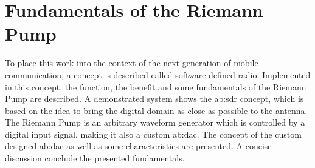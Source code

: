 \chapter{Fundamentals of the Riemann Pump}
\label{ch:fundamentals}
To place this work into the context of the next generation of mobile communication, a concept is described called software-defined radio.
Implemented in this concept, the function, the benefit and some fundamentals of the Riemann Pump are described. 
A demonstrated system shows the \gls{ab:sdr} concept, which is based on the idea to bring the digital domain as close as possible to the antenna.
The Riemann Pump is an arbitrary waveform generator which is controlled by a digital input signal, making it also a custom \gls{ab:dac}.
The concept of the custom designed \gls{ab:dac} as well as some characteristics are presented.
A concise discussion conclude the presented fundamentals.

